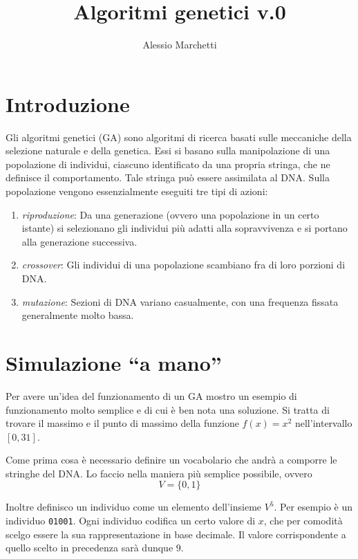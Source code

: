 \documentclass[a4paper, 11pt]{article}
\title{\myfont Algoritmi genetici v.0}
\author{Alessio Marchetti}
\date{}
\newcommand{\code}{\texttt}
\begin{document}
\maketitle

\section{Introduzione}

Gli algoritmi genetici (GA) sono algoritmi di ricerca basati sulle meccaniche
della selezione naturale e della genetica. Essi si basano sulla manipolazione di
una popolazione di individui, ciascuno identificato da una propria stringa, che
ne definisce il comportamento. Tale stringa può essere assimilata al DNA. Sulla
popolazione vengono essenzialmente eseguiti tre tipi di azioni:
\begin{enumerate}
    \item
    \textit{riproduzione}: Da una generazione (ovvero una popolazione in un
        certo istante) si selezionano gli individui più adatti alla
        sopravvivenza e si portano alla generazione successiva.
    \item
    \textit{crossover}: Gli individui di una popolazione scambiano fra di loro
        porzioni di DNA.
    \item
    \textit{mutazione}: Sezioni di DNA variano casualmente, con una frequenza
        fissata generalmente molto bassa.
\end{enumerate}



\section{Simulazione ``a mano''}

Per avere un'idea del funzionamento di un GA mostro un esempio di funzionamento
molto semplice e di cui è ben nota una soluzione. Si tratta di trovare il
massimo e il punto di massimo della funzione $f(x)=x^2$ nell'intervallo
$[0,31]$.

Come prima cosa è necessario definire un vocabolario che andrà a comporre le
stringhe del DNA. Lo faccio nella maniera più semplice possibile, ovvero
$$V=\{0,1\}$$

Inoltre definisco un individuo come un elemento dell'insieme $V^5$. Per esempio
è un individuo \code{01001}. Ogni individuo codifica un certo valore di $x$, che
per comodità scelgo essere la sua rappresentazione in base decimale. Il valore
corrispondente a quello scelto in precedenza sarà dunque $9$.
\end{document}
